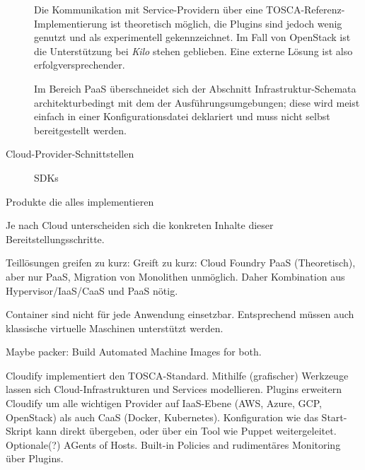 \begin{description}
	\inputminted[]{yaml}{./src/TOSCA.sample.yml}
	
	Die Kommunikation mit Service-Providern über eine TOSCA-Referenz-Implementierung ist theoretisch möglich, die Plugins sind jedoch wenig genutzt und als experimentell gekennzeichnet. Im Fall von OpenStack ist die Unterstützung bei \emph{Kilo} stehen geblieben. Eine externe Lösung ist also erfolgversprechender.
	
	Im Bereich PaaS überschneidet sich der Abschnitt Infrastruktur-Schemata architekturbedingt mit dem der Ausführungsumgebungen; diese wird meist einfach in einer Konfigurationsdatei deklariert und muss nicht selbst bereitgestellt werden.
	
	\item[Cloud-Provider-Schnittstellen] SDKs
	
\end{description}


Produkte die alles implementieren



Je nach Cloud unterscheiden sich die konkreten Inhalte dieser Bereitstellungsschritte.



Teillösungen greifen zu kurz: Greift zu kurz: Cloud Foundry PaaS (Theoretisch), aber nur PaaS, Migration von Monolithen unmöglich. Daher Kombination aus Hypervisor/IaaS/CaaS und PaaS nötig.

Container sind nicht für jede Anwendung einsetzbar. Entsprechend müssen auch klassische virtuelle Maschinen unterstützt werden.

Maybe packer: Build Automated Machine Images for both.

%

Cloudify implementiert den TOSCA-Standard. Mithilfe (grafischer) Werkzeuge lassen sich Cloud-Infrastrukturen und Services modellieren. Plugins erweitern Cloudify um alle wichtigen Provider auf IaaS-Ebene (AWS, Azure, GCP, OpenStack) als auch CaaS (Docker, Kubernetes). Konfiguration wie das Start-Skript kann direkt übergeben, oder über ein Tool wie Puppet weitergeleitet. Optionale(?) AGents of Hosts. Built-in Policies and rudimentäres Monitoring über Plugins.

